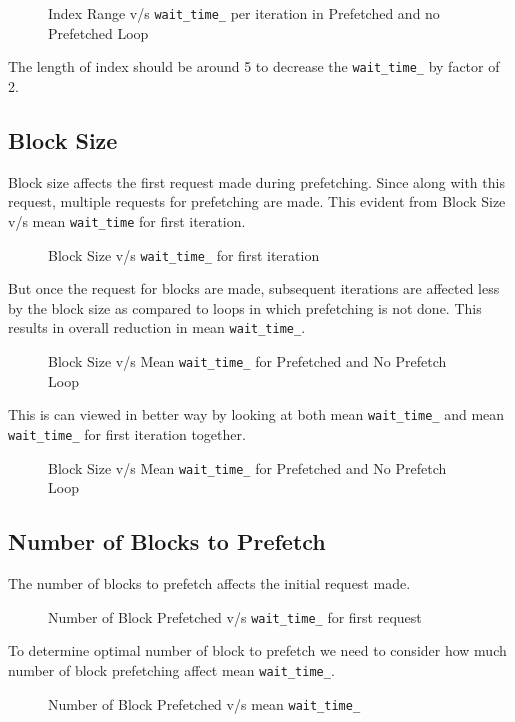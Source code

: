\begin{figure}[h]
  
  \caption{Index Range v/s \texttt{wait\_time\_} per iteration in Prefetched and no Prefetched Loop}
\end{figure}

The length of index should be around 5 to decrease the \texttt{wait\_time\_}
by factor of 2.

\subsection{Block Size}
Block size affects the first request made during prefetching. Since along with this
request, multiple requests for prefetching are made. This evident from Block Size
v/s mean \texttt{wait\_time} for first iteration.
\begin{figure}[h]
  
  \caption{Block Size v/s \texttt{wait\_time\_} for first iteration}
\end{figure}

But once the request for blocks are made, subsequent iterations are affected less
by the block size as compared to loops in which prefetching is not done. This results
in overall reduction in mean \texttt{wait\_time\_}.
\begin{figure}[h]
  
  \caption{Block Size v/s Mean \texttt{wait\_time\_} for Prefetched and No Prefetch Loop}
\end{figure}

This is can viewed in better way by looking at both mean \texttt{wait\_time\_} and
mean \texttt{wait\_time\_} for first iteration together.
\begin{figure}[h]
  
  \caption{Block Size v/s Mean \texttt{wait\_time\_} for Prefetched and No Prefetch Loop}
\end{figure}

\subsection{Number of Blocks to Prefetch}
The number of blocks to prefetch affects the initial request made.
\begin{figure}[h]
  
  \caption{Number of Block Prefetched v/s \texttt{wait\_time\_} for first request}
\end{figure}

To determine optimal number of block to prefetch we need to consider how much
number of block prefetching affect mean \texttt{wait\_time\_}.
\begin{figure}[h]
  
  \caption{Number of Block Prefetched v/s mean \texttt{wait\_time\_}}
\end{figure}

